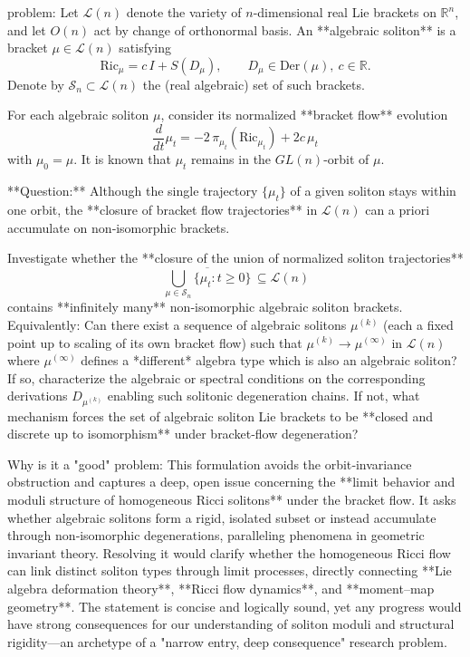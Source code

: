problem:  
Let \(\mathcal{L}(n)\) denote the variety of \(n\)-dimensional real Lie brackets on \(\mathbb{R}^n\), and let \(O(n)\) act by change of orthonormal basis.  
An **algebraic soliton** is a bracket \(\mu\in\mathcal{L}(n)\) satisfying  
\[
\mathrm{Ric}_\mu = c\, I + S(D_\mu), \qquad D_\mu \in \mathrm{Der}(\mu),\ c\in \mathbb{R}.
\]
Denote by \(\mathcal{S}_n\subset \mathcal{L}(n)\) the (real algebraic) set of such brackets.

For each algebraic soliton \(\mu\), consider its normalized **bracket flow** evolution
\[
\frac{d}{dt}\mu_t = -2\,\pi_{\mu_t}(\mathrm{Ric}_{\mu_t}) + 2c\,\mu_t
\]
with \(\mu_0=\mu\).  It is known that \(\mu_t\) remains in the \(GL(n)\)-orbit of \(\mu\).

**Question:**  
Although the single trajectory \(\{\mu_t\}\) of a given soliton stays within one orbit, the **closure of bracket flow trajectories** in \(\mathcal{L}(n)\) can a priori accumulate on non‑isomorphic brackets.  

Investigate whether the **closure of the union of normalized soliton trajectories**
\[
\overline{\, \bigcup_{\mu\in\mathcal{S}_n}\{\mu_t:t\ge0\}\,}
\subseteq \mathcal{L}(n)
\]
contains **infinitely many** non‑isomorphic algebraic soliton brackets.  
Equivalently:  
Can there exist a sequence of algebraic solitons \(\mu^{(k)}\) (each a fixed point up to scaling of its own bracket flow) such that \(\mu^{(k)} \to \mu^{(\infty)}\) in \(\mathcal{L}(n)\) where \(\mu^{(\infty)}\) defines a *different* algebra type which is also an algebraic soliton?  
If so, characterize the algebraic or spectral conditions on the corresponding derivations \(D_{\mu^{(k)}}\) enabling such solitonic degeneration chains.  
If not, what mechanism forces the set of algebraic soliton Lie brackets to be **closed and discrete up to isomorphism** under bracket‑flow degeneration?

Why is it a "good" problem:  
This formulation avoids the orbit‑invariance obstruction and captures a deep, open issue concerning the **limit behavior and moduli structure of homogeneous Ricci solitons** under the bracket flow.  It asks whether algebraic solitons form a rigid, isolated subset or instead accumulate through non‑isomorphic degenerations, paralleling phenomena in geometric invariant theory.  Resolving it would clarify whether the homogeneous Ricci flow can link distinct soliton types through limit processes, directly connecting **Lie algebra deformation theory**, **Ricci flow dynamics**, and **moment–map geometry**.  The statement is concise and logically sound, yet any progress would have strong consequences for our understanding of soliton moduli and structural rigidity—an archetype of a "narrow entry, deep consequence" research problem.